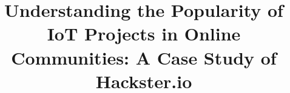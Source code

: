 \documentclass[10pt,conference]{IEEEtran}
\begin{document}
	\title{Understanding the Popularity of IoT Projects in Online Communities: A Case Study of Hackster.io}
%

\author{
	\vspace{1.45cm}}


	\maketitle
	
	\begin{abstract}\label{section:abstract}
		
	\end{abstract}
	
	\IEEEpeerreviewmaketitle
	
	
	
	
	
	
	
	
	
	
	
	
	
	
	
	
	
	
	 
	
\end{document}
